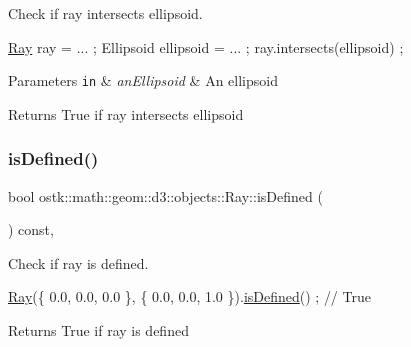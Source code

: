 Check if ray intersects ellipsoid. 


\begin{DoxyCode}
\hyperlink{classostk_1_1math_1_1geom_1_1d3_1_1objects_1_1_ray_a78335698f8a4f72e613e607b13121df0}{Ray} ray = ... ;
Ellipsoid ellipsoid = ... ;
ray.intersects(ellipsoid) ;
\end{DoxyCode}



\begin{DoxyParams}[1]{Parameters}
\mbox{\tt in}  & {\em an\+Ellipsoid} & An ellipsoid \\
\hline
\end{DoxyParams}
\begin{DoxyReturn}{Returns}
True if ray intersects ellipsoid 
\end{DoxyReturn}
\mbox{\label{classostk_1_1math_1_1geom_1_1d3_1_1objects_1_1_ray_ac0d991765b5d91a978fda87696b8069d}} 
\subsubsection{\texorpdfstring{is\+Defined()}{isDefined()}}
{\footnotesize\ttfamily bool ostk\+::math\+::geom\+::d3\+::objects\+::\+Ray\+::is\+Defined (\begin{DoxyParamCaption}{ }\end{DoxyParamCaption}) const\hspace{0.3cm}{\ttfamily [override]}, {\ttfamily [virtual]}}



Check if ray is defined. 


\begin{DoxyCode}
\hyperlink{classostk_1_1math_1_1geom_1_1d3_1_1objects_1_1_ray_a78335698f8a4f72e613e607b13121df0}{Ray}(\{ 0.0, 0.0, 0.0 \}, \{ 0.0, 0.0, 1.0 \}).\hyperlink{classostk_1_1math_1_1geom_1_1d3_1_1objects_1_1_ray_ac0d991765b5d91a978fda87696b8069d}{isDefined}() ; \textcolor{comment}{// True}
\end{DoxyCode}


\begin{DoxyReturn}{Returns}
True if ray is defined 
\end{DoxyReturn}


